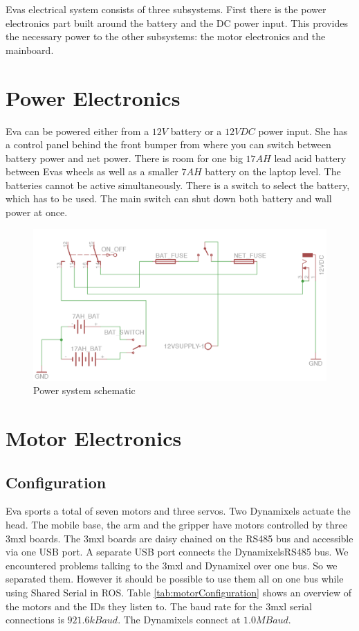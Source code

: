 \documentclass[technical_document.tex]{subfiles}
\begin{document}
Eva\textquotesingle s electrical system consists of three subsystems. First there is the power electronics part built around the battery and the DC power input. This provides the necessary power to the other subsystems: the motor electronics and the mainboard. 

\section{Power Electronics}

Eva can be powered either from a $12V$ battery or a $12V DC$ power input. She has a control panel behind the front bumper from where you can switch between battery power and net power. 
There is room for one big $17AH$ lead acid battery between Eva\textquotesingle s wheels as well as a smaller $7AH$ battery on the laptop level. The batteries cannot be active simultaneously. There is a switch to select the battery, which has to be used.  The main switch can shut down both battery and wall power at once.
 
 \begin{figure}[ht!]
	\centering
	\mbox{\includegraphics[scale=1.0]{Images/power_system.png}}
	\caption{Power system schematic}
	\label{fig:power_system}
\end{figure}
 
\section{Motor Electronics}

\subsection{Configuration}
Eva sports a total of seven motors and three servos. Two Dynamixels actuate the head. The mobile base, the arm and the gripper have motors controlled by three 3mxl boards. The 3mxl boards are daisy chained on the RS485 bus and accessible via one USB port. A separate USB port connects the Dynamixels\textquotesingle  RS485 bus. 
We encountered problems talking to the 3mxl and Dynamixel over one bus. So we separated them. However it should be possible to use them all on one bus while using Shared Serial in ROS.
Table \ref{tab:motorConfiguration} shows an overview of the motors and the ID\textquotesingle s they listen to. The baud rate for the 3mxl serial connections is $921.6 kBaud$. The Dynamixels connect at $1.0 MBaud$.
\end{document}
